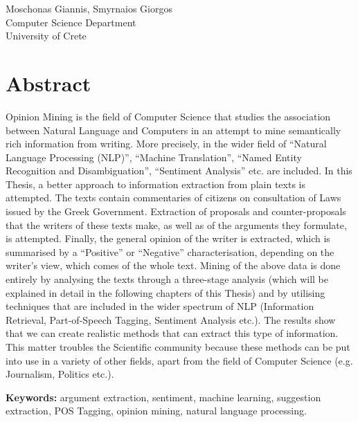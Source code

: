 Moschonas Giannis, Smyrnaios Giorgos\\
Computer Science Department\\
University of Crete \setlength{\parskip}{0.5cm}

\thispagestyle{plain}			%
\setlength{\parskip}{0pt plus 1.0pt}
\section*{Abstract}
Opinion Mining is the field of Computer Science that studies the association between Natural Language and Computers in an attempt to mine semantically rich information from writing. More precisely, in the wider field of ``Natural Language Processing (NLP)'', ``Machine Translation'', ``Named Entity Recognition and Disambiguation'', ``Sentiment Analysis'' etc. are included. In this Thesis, a better approach to information extraction from plain texts is attempted. The texts contain commentaries of citizens on consultation of Laws issued by the Greek Government. Extraction of proposals and counter-proposals that the writers of these texts make, as well as of the arguments they formulate, is attempted. Finally, the general opinion of the writer is extracted, which is summarised by a ``Positive'' or ``Negative'' characterisation, depending on  the writer's view, which comes of the whole text. Mining of the above data is done entirely by analysing the texts through a three-stage analysis (which will be explained in detail in the following chapters of this Thesis) and by utilising techniques that are included in the wider spectrum of NLP (Information Retrieval, Part-of-Speech Tagging, Sentiment Analysis etc.). The results show that we can create realistic methods that can extract this type of information. This matter troubles the Scientific community because these methods can be put into use in a variety of other fields, apart from the field of Computer Science (e.g. Journalism, Politics etc.).





\vfill
\textbf{Keywords:} argument extraction, sentiment, machine learning, suggestion extraction, POS Tagging, opinion mining, natural language processing.
